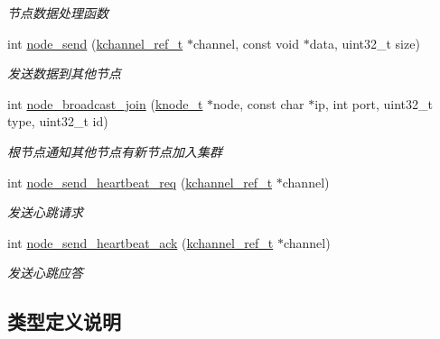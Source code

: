 \begin{DoxyCompactItemize}
\begin{DoxyCompactList}\small\item\em 节点数据处理函数 \end{DoxyCompactList}\item 
int \hyperlink{a00101_a831f5f4ac169e5ed74b828acf7b39a1c_a831f5f4ac169e5ed74b828acf7b39a1c}{node\+\_\+send} (\hyperlink{a00066_a3b7e82599367eade261456f60ebe2cd9_a3b7e82599367eade261456f60ebe2cd9}{kchannel\+\_\+ref\+\_\+t} $\ast$channel, const void $\ast$data, uint32\+\_\+t size)
\begin{DoxyCompactList}\small\item\em 发送数据到其他节点 \end{DoxyCompactList}\item 
int \hyperlink{a00101_a8dfe36d41c6c4a45445387aed78ef7dd_a8dfe36d41c6c4a45445387aed78ef7dd}{node\+\_\+broadcast\+\_\+join} (\hyperlink{a00066_a5e720b27efbc9ad744240f5f4233763a_a5e720b27efbc9ad744240f5f4233763a}{knode\+\_\+t} $\ast$node, const char $\ast$ip, int port, uint32\+\_\+t type, uint32\+\_\+t id)
\begin{DoxyCompactList}\small\item\em 根节点通知其他节点有新节点加入集群 \end{DoxyCompactList}\item 
int \hyperlink{a00101_acb8219f989e66e827adc668bb0bb3649_acb8219f989e66e827adc668bb0bb3649}{node\+\_\+send\+\_\+heartbeat\+\_\+req} (\hyperlink{a00066_a3b7e82599367eade261456f60ebe2cd9_a3b7e82599367eade261456f60ebe2cd9}{kchannel\+\_\+ref\+\_\+t} $\ast$channel)
\begin{DoxyCompactList}\small\item\em 发送心跳请求 \end{DoxyCompactList}\item 
int \hyperlink{a00101_a25f4321eb35ddd75d6e026a0055ade30_a25f4321eb35ddd75d6e026a0055ade30}{node\+\_\+send\+\_\+heartbeat\+\_\+ack} (\hyperlink{a00066_a3b7e82599367eade261456f60ebe2cd9_a3b7e82599367eade261456f60ebe2cd9}{kchannel\+\_\+ref\+\_\+t} $\ast$channel)
\begin{DoxyCompactList}\small\item\em 发送心跳应答 \end{DoxyCompactList}\end{DoxyCompactItemize}


\subsection{类型定义说明}
\hypertarget{a00101_a8624d982efa4afd872ffe22695031845_a8624d982efa4afd872ffe22695031845}{}
